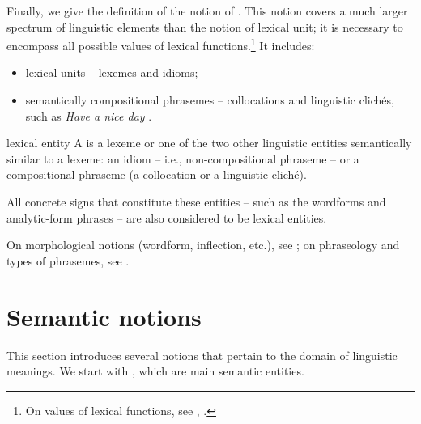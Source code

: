 Finally, we give the definition of the notion of \label{txt:lexicalEntityDef}. This notion covers a much larger spectrum of linguistic elements than the notion of lexical unit; it is necessary to encompass all possible values of lexical functions.\footnote{On values of lexical functions, see , .} It includes:

\begin{itemize}

\item lexical units -- lexemes and idioms;

\item semantically compositional phrasemes -- collocations and linguistic clichés, such as \textit{Have a nice day} \parencite{Melcuk2020a}.

\end{itemize}

\label{def:lexicalEntity}\begin{notiondefinition}{lexical entity}
A  is a lexeme or one of the two other linguistic entities semantically similar to a lexeme: an idiom -- i.e., non-compositional phraseme -- or a compositional phraseme (a collocation or a linguistic cliché).

All concrete signs that constitute these entities -- such as the wordforms and analytic-form phrases -- are also considered to be lexical entities.
\end{notiondefinition}

\begin{furtherreading}
On morphological notions (wordform, inflection, etc.), see \textcite{Melcuk2006b}; on phraseology and types of phrasemes, see \textcite{Melcuk2023a}.
\end{furtherreading}

\section{Semantic notions}\label{sec:semanticNotions}

\largerpage[2]
This section introduces several notions that pertain to the domain of linguistic meanings. We start with , which are main semantic entities.

